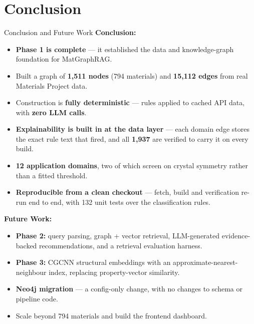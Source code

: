 \documentclass{beamer}
\begin{document}
\section{Conclusion}
\begin{frame}{Conclusion and Future Work}
    \textbf{Conclusion:}
    \begin{itemize}
        \item \textbf{Phase 1 is complete} --- it established the data and knowledge-graph foundation for MatGraphRAG.
        \item Built a graph of \textbf{1,511 nodes} (794 materials) and \textbf{15,112 edges} from real Materials Project data.
        \item Construction is \textbf{fully deterministic} --- rules applied to cached API data, with \textbf{zero LLM calls}.
        \item \textbf{Explainability is built in at the data layer} --- each domain edge stores the exact rule text that fired, and all \textbf{1,937} are verified to carry it on every build.
        \item \textbf{12 application domains}, two of which screen on crystal symmetry rather than a fitted threshold.
        \item \textbf{Reproducible from a clean checkout} --- fetch, build and verification re-run end to end, with 132 unit tests over the classification rules.
    \end{itemize}

    \vspace{0.25cm}
    \textbf{Future Work:}
    \begin{itemize}
        \item \textbf{Phase 2:} query parsing, graph + vector retrieval, LLM-generated evidence-backed recommendations, and a retrieval evaluation harness.
        \item \textbf{Phase 3:} CGCNN structural embeddings with an approximate-nearest-neighbour index, replacing property-vector similarity.
        \item \textbf{Neo4j migration} --- a config-only change, with no changes to schema or pipeline code.
        \item Scale beyond 794 materials and build the frontend dashboard.
    \end{itemize}
\end{frame}
\end{document}
